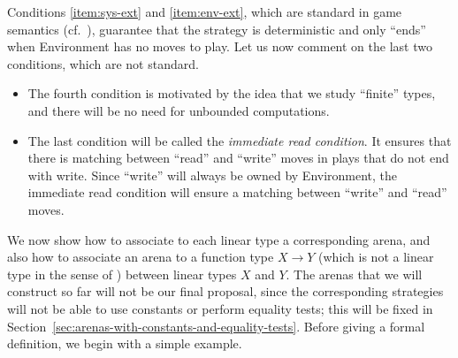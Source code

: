 \documentclass[a4paper,UKenglish,cleveref, autoref, numberwithinsect, thm-restate]{lipics-v2021}
\begin{document}
Conditions \ref{item:sys-ext} and \ref{item:env-ext}, which are standard in game semantics (cf.~\cite[p.~5]{abramsky2013semantics}),  guarantee that the strategy is deterministic and only ``ends'' when 
Environment has no moves to play.  Let us now comment on the last two conditions, which are not standard.
\begin{itemize}
    \item The fourth condition is motivated by the idea that we study ``finite'' types,  and there will be no need for unbounded computations. 
    \item The last condition will be called the  \emph{immediate read condition}. It ensures that there is matching between ``read'' and ``write'' moves in plays that do not end with write. Since ``write'' will always be owned by Environment, the immediate read condition will ensure a matching between ``write'' and ``read'' moves.
\end{itemize}
We now show how to associate to each linear type a corresponding arena, and also how to associate an arena to a function type $X \to Y$ (which is not a linear type in the sense of ) between linear types $X$ and $Y$. The arenas that we will construct so far will not be our final proposal, since the corresponding strategies will not be able to use constants or perform equality tests; this will be fixed in Section~\ref{sec:arenas-with-constants-and-equality-tests}. Before giving a formal definition, we begin with a simple example.
\end{document}
